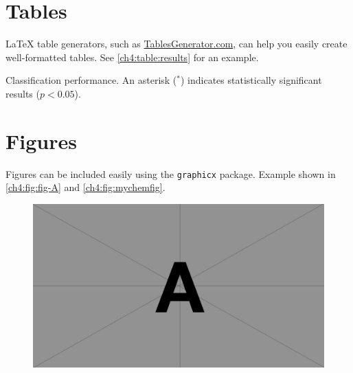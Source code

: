 \section{Tables}
\begin{paragraph}
{\LaTeX} table generators, such as \href{https://www.tablesgenerator.com/}{TablesGenerator.com}, can help you easily create well-formatted tables. See \autoref{ch4:table:results} for an example.
\end{paragraph}

\begin{table}[ht]
\caption{Classification performance. An asterisk ($^*$) indicates statistically significant results ($p<0.05$).}
\label{ch4:table:results}
\centering
\normalsize\singlespacingplus

\end{table}

\section{Figures}
\begin{paragraph}
Figures can be included easily using the \texttt{graphicx} package. Example shown in \autoref{ch4:fig:fig-A} and \autoref{ch4:fig:mychemfig}.
\end{paragraph}

\begin{figure}[ht]
    \centering
    \includegraphics[width=1\columnwidth]{figures/ch4/A.pdf}
    \label{ch4:fig:fig-A}
\end{figure}

